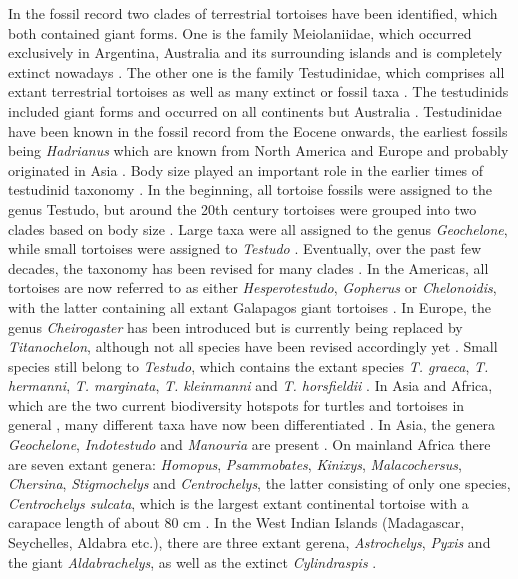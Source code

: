 In the fossil record two clades of terrestrial tortoises have been identified, which both contained giant forms. One is the family Meiolaniidae, which occurred exclusively in Argentina, Australia and its surrounding islands and is completely extinct nowadays \citep{Sterli2015, Hay1908}. The other one is the family Testudinidae, which comprises all extant terrestrial tortoises as well as many extinct or fossil taxa \citep{Auffenberg1974,VanDijk2014}. The testudinids included giant forms and occurred on all continents but Australia \citep{Fritz2007}.
Testudinidae have been known in the fossil record from the Eocene onwards, the earliest fossils being \textit{Hadrianus} which are known from North America and Europe and probably originated in Asia \citep{Cope1871}.
Body size played an important role in the earlier times of testudinid taxonomy \citep{DeLapparentdeBroin2001,DeLapparentdeBroin2000}. In the beginning, all tortoise fossils were assigned to the genus Testudo, but around the 20th century tortoises were grouped into two clades based on body size \citep{DeLapparentdeBroin2006}. Large taxa were all assigned to the genus \textit{Geochelone}, while small tortoises were assigned to \textit{Testudo} \citep{DeLapparentdeBroin2001,DeLapparentdeBroin2000}.
Eventually, over the past few decades, the taxonomy has been revised for many clades \citep{DeLapparentdeBroin2000}. In the Americas, all tortoises are now referred to as either \textit{Hesperotestudo}, \textit{Gopherus} or \textit{Chelonoidis}, with the latter containing all extant Galapagos giant tortoises \citep{Fritts1984}. In Europe, the genus \textit{Cheirogaster} has been introduced but is currently being replaced by \textit{Titanochelon}, although not all species have been revised accordingly yet \citep{Perez-Garcia2014}. Small species still belong to \textit{Testudo}, which contains the extant species \textit{T. graeca}, \textit{T. hermanni}, \textit{T. marginata}, \textit{T. kleinmanni} and \textit{T. horsfieldii} \citep{Fritz2007}.
In Asia and Africa, which are the two current biodiversity hotspots for turtles and tortoises in general , many different taxa have now been differentiated \citep{Holroyd2003}.
In Asia, the genera \textit{Geochelone}, \textit{Indotestudo} and \textit{Manouria} are present \citep{Claude2011,Tong2006}. On mainland Africa there are seven extant genera: \textit{Homopus}, \textit{Psammobates}, \textit{Kinixys}, \textit{Malacochersus}, \textit{Chersina}, \textit{Stigmochelys} and \textit{Centrochelys}, the latter consisting of only one species, \textit{Centrochelys sulcata}, which is the largest extant continental tortoise with a carapace length of about 80 cm \citep{Hansen2010}. In the West Indian Islands (Madagascar, Seychelles, Aldabra etc.), there are three extant gerena, \textit{Astrochelys}, \textit{Pyxis} and the giant \textit{Aldabrachelys}, as well as the extinct \textit{Cylindraspis} \citep{Austin2003,Austin2001}.

